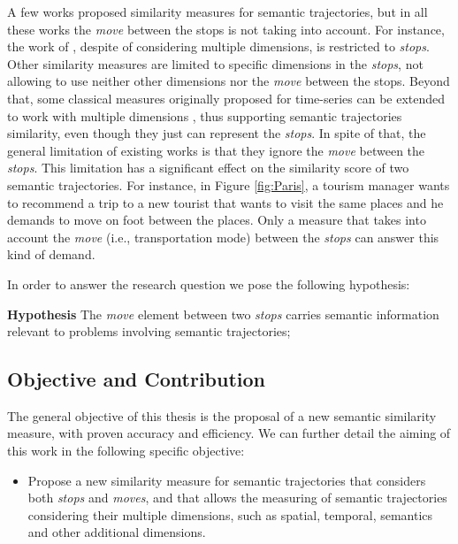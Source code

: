 \documentclass[12pt]{article}
\begin{document}
A few works proposed similarity measures for semantic trajectories, but in all these works the \emph{move} between the stops is not taking into account. For instance, the work of \cite{Furtado:TGIS12156}, despite of considering multiple dimensions, is restricted to \emph{stops}. Other similarity measures \cite{Kang:2009:SMT:1529282.1529580, Ying:2010:MUS:1867699.1867703, Liu:2012:SMM:2442968.2442971} are limited to specific dimensions in the \emph{stops}, not allowing to use neither other dimensions nor the \emph{move} between the stops. Beyond that, some classical measures originally proposed for time-series can be extended to work with multiple dimensions \cite{vlachos2002discovering, Chen:2004:MLE:1316689.1316758, Chen:2005:RFS:1066157.1066213}, thus supporting semantic trajectories similarity, even though they just can represent the \emph{stops}. In spite of that, the general limitation of existing works is that they ignore the \emph{move} between the \emph{stops}. This limitation has a significant effect on the similarity score of two semantic trajectories. For instance, in Figure \ref{fig:Paris}, a tourism manager wants to recommend a trip to a new tourist that wants to visit the same places and he demands to move on foot between the places. Only a measure that takes into account the \emph{move} (i.e., transportation mode) between the \emph{stops} can answer this kind of demand.

In order to answer the research question we pose the following hypothesis:

\textbf{Hypothesis} The \emph{move} element between two \emph{stops} carries semantic information relevant to problems involving semantic trajectories;

\subsection{Objective and Contribution}

The general objective of this thesis is the proposal of a new semantic similarity measure, with proven accuracy and efficiency. We can further detail the aiming of this work in the following specific objective:

\begin{itemize}
  \item Propose a new similarity measure for semantic trajectories that considers both \emph{stops} and \emph{moves}, and that allows the measuring of semantic trajectories considering their multiple dimensions, such as spatial, temporal, semantics and other additional dimensions.
\end{itemize}
\end{document}
